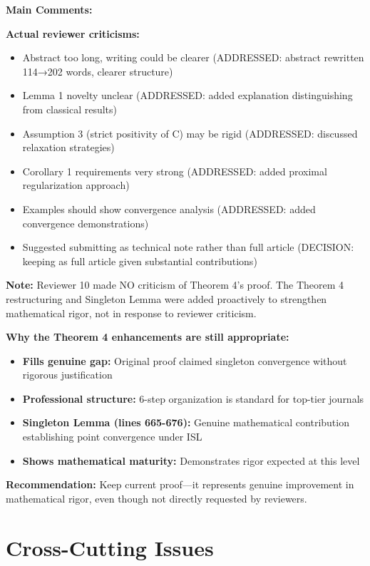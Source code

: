 \documentclass[11pt]{article}
\begin{document}
\textbf{Main Comments:}

\textbf{Actual reviewer criticisms:}
\begin{itemize}[leftmargin=*]
\item Abstract too long, writing could be clearer (ADDRESSED: abstract rewritten 114→202 words, clearer structure)
\item Lemma 1 novelty unclear (ADDRESSED: added explanation distinguishing from classical results)
\item Assumption 3 (strict positivity of C) may be rigid (ADDRESSED: discussed relaxation strategies)
\item Corollary 1 requirements very strong (ADDRESSED: added proximal regularization approach)
\item Examples should show convergence analysis (ADDRESSED: added convergence demonstrations)
\item Suggested submitting as technical note rather than full article (DECISION: keeping as full article given substantial contributions)
\end{itemize}

\textbf{Note:} \textcolor{critical}{Reviewer 10 made NO criticism of Theorem 4's proof.} The Theorem 4 restructuring and Singleton Lemma were added proactively to strengthen mathematical rigor, not in response to reviewer criticism.

\textbf{Why the Theorem 4 enhancements are still appropriate:}
\begin{itemize}[leftmargin=*]
\item \textbf{Fills genuine gap:} Original proof claimed singleton convergence without rigorous justification
\item \textbf{Professional structure:} 6-step organization is standard for top-tier journals
\item \textbf{Singleton Lemma (lines 665-676):} Genuine mathematical contribution establishing point convergence under ISL
\item \textbf{Shows mathematical maturity:} Demonstrates rigor expected at this level
\end{itemize}

\textbf{Recommendation:} Keep current proof—it represents genuine improvement in mathematical rigor, even though not directly requested by reviewers.

\section{Cross-Cutting Issues}
\end{document}
